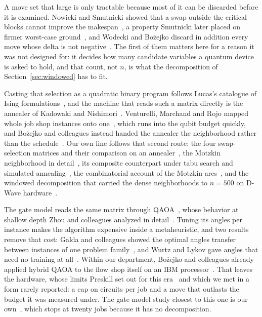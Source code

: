 \documentclass[runningheads]{llncs}
\begin{document}
A move set that large is only tractable because most of it can be discarded
before it is examined. Nowicki and Smutnicki showed that a swap outside the
critical blocks cannot improve the makespan~\cite{nowicki1996}, a property
Smutnicki later placed on firmer worst-case ground~\cite{smutnicki1998}, and
Wodecki and Bo\.{z}ejko discard in addition every move whose delta is not
negative~\cite{wodecki04}. The first of them matters here for a reason it was
not designed for: it decides how many candidate variables a quantum device is
asked to hold, and that count, not $n$, is what the decomposition of
Section~\ref{sec:windowed} has to fit.

Casting that selection as a quadratic binary program follows Lucas's catalogue
of Ising formulations~\cite{lucas2014ising}, and the machine that reads such a
matrix directly is the annealer of Kadowaki and
Nishimori~\cite{kadowaki1998}. Venturelli, Marchand and Rojo mapped whole job
shop instances onto one~\cite{venturelli2015}, which runs into the qubit budget
quickly, and Bo\.{z}ejko and colleagues instead handed the annealer the
neighborhood rather than the schedule~\cite{bozejko2026new}. Our own line follows
that second route: the four swap-selection matrices and their comparison on an
annealer~\cite{wojewodzki2026bpasts}, the Motzkin neighborhood in
detail~\cite{wojewodzki2026soco}, its composite counterpart under tabu search
and simulated annealing~\cite{wojewodzki2026icaisc}, the combinatorial account
of the Motzkin arcs~\cite{wojewodzki2025exit}, and the windowed decomposition
that carried the dense neighborhoods to $n = 500$ on D-Wave
hardware~\cite{wojewodzki2026windowed}.

The gate model reads the same matrix through QAOA~\cite{farhi2014qaoa}, whose
behavior at shallow depth Zhou and colleagues analyzed in
detail~\cite{zhou2020}. Tuning its angles per instance makes the algorithm expensive inside a
metaheuristic, and two results remove that cost:
Galda and colleagues showed the optimal angles transfer between instances of
one problem family~\cite{galda2021}, and Wurtz and Lykov gave angles that need
no training at all~\cite{wurtz2021fixed}. Within our department, Bo\.{z}ejko
and colleagues already applied hybrid QAOA to the flow shop itself on an IBM
processor~\cite{bozejko2024cinti}. That leaves the hardware, whose
limits Preskill set out for this era~\cite{preskill2018} and which we met in a
form rarely reported: a cap on circuits per job and a move that outlasts the
budget it was measured under. The gate-model study closest to this one is our
own~\cite{wojewodzki2026gcmm}, which stops at twenty jobs because it has no
decomposition.
\end{document}

